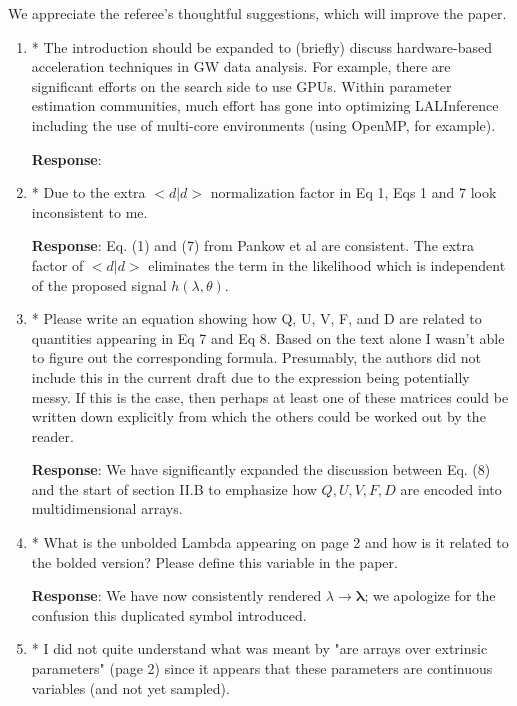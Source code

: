 \documentclass[onecolumn]{revtex4}
\begin{document}
We appreciate the referee's thoughtful suggestions, which will improve the paper.


\begin{enumerate}
\item * The introduction should be expanded to (briefly) discuss
hardware-based acceleration techniques in GW data analysis. For
example, there are significant efforts on the search side to use GPUs.
Within parameter estimation communities, much effort has gone into
optimizing LALInference including the use of multi-core environments
(using OpenMP, for example).

\noindent \textbf{Response}:

\item * Due to the extra $<d | d >$ normalization factor in Eq 1, Eqs 1 and 7
look inconsistent to me.

\noindent \textbf{Response}:  Eq. (1) and (7) from Pankow et al are consistent.  The extra factor of $<d|d>$ eliminates the term in the likelihood which is independent of
the proposed signal $h(\lambda,\theta)$.

\item * Please write an equation showing how Q, U, V, F, and D are related
to quantities appearing in Eq 7 and Eq 8. Based on the text alone I
wasn't able to figure out the corresponding formula. Presumably, the
authors did not include this in the current draft due to the
expression being potentially messy. If this is the case, then perhaps
at least one of these matrices could be written down explicitly from
which the others could be worked out by the reader.

\noindent \textbf{Response}: We have significantly expanded the discussion between Eq. (8) and the start of section II.B
to emphasize how $Q,U,V,F,D$ are encoded into multidimensional arrays.



\item * What is the unbolded Lambda appearing on page 2 and how is it
related to the bolded version? Please define this variable in the
paper.

\noindent \textbf{Response}: We have now consistently rendered $\lambda\rightarrow \bm{\lambda}$; we apologize for the
confusion this duplicated symbol introduced.

\item * I did not quite understand what was meant by "are arrays over
extrinsic parameters" (page 2) since it appears that these parameters
are continuous variables (and not yet sampled).


\end{enumerate}
\end{document}
